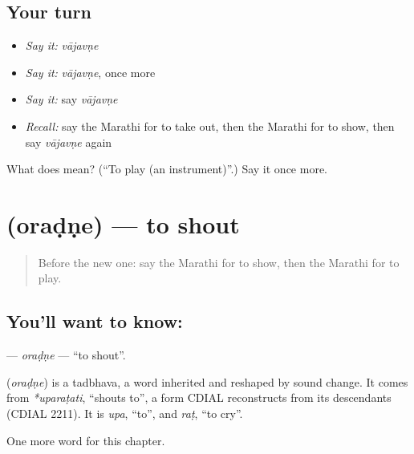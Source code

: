 \subsection*{Your turn}
\begin{itemize}
\raggedright
  \item \emph{Say it:} \emph{vājavṇe}
  \item \emph{Say it:} \emph{vājavṇe}, once more
  \item \emph{Say it:} say \emph{vājavṇe}
  \item \emph{Recall:} say the Marathi for to take out, then the Marathi for to show, then say \emph{vājavṇe} again
\end{itemize}

\begin{tcolorbox}[breakable,colback=teal!4,colframe=teal!35!black,title={Before you move on}]
What does  mean? (\textquotedblleft{}To play (an instrument)\textquotedblright{}.) Say it once more.
\end{tcolorbox}
\section[\texorpdfstring{\mr{ओरडणे} (oraḍṇe)}{ओरडणे (oraḍṇe)}]{ (oraḍṇe) — to shout}

\label{lesson:MR-C156-oradne}



\begin{quote}
Before the new one: say the Marathi for to show, then the Marathi for to play.
\end{quote}

\subsection*{You'll want to know: }
\textbf{} — \emph{oraḍṇe} — \textquotedblleft{}to shout\textquotedblright{}.

\begin{cousinweb}
\textbf{} (\emph{oraḍṇe}) is a tadbhava, a word inherited and reshaped by sound change. It comes from \emph{*uparaṭati}, \textquotedblleft{}shouts to\textquotedblright{}, a form CDIAL reconstructs from its descendants (CDIAL 2211). It is \emph{upa}, \textquotedblleft{}to\textquotedblright{}, and \emph{raṭ}, \textquotedblleft{}to cry\textquotedblright{}.
\end{cousinweb}

\begin{grammarlens}[title={What you've built}]
One more word for this chapter.
\end{grammarlens}

